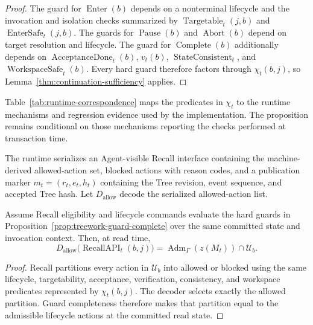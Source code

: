 \begin{proof}
The guard for $\operatorname{Enter}(b)$ depends on a nonterminal lifecycle and
the invocation and isolation checks summarized by
$\operatorname{Targetable}_t(j,b)$ and $\operatorname{EnterSafe}_t(j,b)$.
The guards for $\operatorname{Pause}(b)$ and $\operatorname{Abort}(b)$ depend on
target resolution and lifecycle.  The guard for
$\operatorname{Complete}(b)$ additionally depends on
$\operatorname{AcceptanceDone}_t(b)$, $v_t(b)$,
$\operatorname{StateConsistent}_t$, and
$\operatorname{WorkspaceSafe}_t(b)$.  Every hard guard therefore factors
through $\chi_t(b,j)$, so
Lemma~\ref{thm:continuation-sufficiency} applies.
\end{proof}

Table~\ref{tab:runtime-correspondence} maps the predicates in $\chi_t$ to the
runtime mechanisms and regression evidence used by the implementation.  The
proposition remains conditional on those mechanisms reporting the checks
performed at transaction time.

The runtime serializes an Agent-visible Recall interface containing the
machine-derived allowed-action set, blocked actions with reason codes, and a
publication marker $m_t=(r_t,e_t,h_t)$ containing the Tree revision, event
sequence, and accepted Tree hash.  Let $D_{\mathrm{allow}}$ decode the serialized
allowed-action list.

\begin{proposition}
\label{prop:recall-interface-correspondence}
Assume Recall eligibility and lifecycle commands evaluate the hard guards in
Proposition~\ref{prop:treework-guard-complete} over the same committed state and
invocation context.  Then, at read time,
\begin{equation}
D_{\mathrm{allow}}
\bigl(\operatorname{RecallAPI}_t(b,j)\bigr)
=
\operatorname{Adm}_\Gamma(z(M_t))\cap\mathcal U_b.
\label{eq:recall-interface-correspondence}
\end{equation}
\end{proposition}

\begin{proof}
Recall partitions every action in $\mathcal U_b$ into allowed or blocked using
the same lifecycle, targetability, acceptance, verification, consistency, and
workspace predicates represented by $\chi_t(b,j)$.  The decoder selects exactly
the allowed partition.  Guard completeness therefore makes that partition
equal to the admissible lifecycle actions at the committed read state.
\end{proof}

